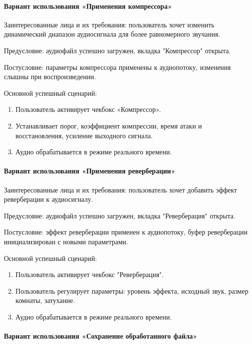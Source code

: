 \paragraph{Вариант использования «Применения компрессора»}

Заинтересованные лица и их требования: пользователь хочет изменить динамический диапазон аудиосигнала для более равномерного звучания.

Предусловие: аудиофайл успешно загружен, вкладка "Компрессор" открыта.

Постусловие: параметры компрессора применены к аудиопотоку, изменения слышны при воспроизведении.

Основной успешный сценарий:
\begin{enumerate}
	\item Пользователь активирует чекбокс «Компрессор».
	\item Устанавливает порог, коэффициент компрессии, время атаки и восстановления, усиление выходного сигнала.
	\item Аудио обрабатывается в режиме реального времени.
\end{enumerate}

\paragraph{Вариант использования «Применения реверберации»}

Заинтересованные лица и их требования: пользователь хочет добавить эффект реверберации к аудиосигналу.

Предусловие: аудиофайл успешно загружен, вкладка "Реверберация" открыта.

Постусловие: эффект реверберации применен к аудиопотоку, буфер реверберации инициализирован с новыми параметрами.

Основной успешный сценарий:
\begin{enumerate}
	\item Пользователь активирует чекбокс "Реверберация".
	\item Пользователь регулирует параметры: уровень эффекта, исходный звук, размер комнаты, затухание.
	\item Аудио обрабатывается в режиме реального времени.
\end{enumerate}	

\paragraph{Вариант использования «Сохранение обработанного файла»}

